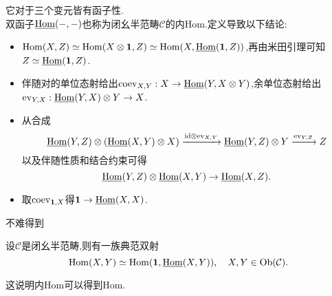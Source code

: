 它对于三个变元皆有函子性.\\

双函子$\underline{\operatorname{Hom}}(-,-)$也称为闭幺半范畴$\mathcal{C}$的内Hom.定义导致以下结论:
\begin{itemize}
    \item $\operatorname{Hom}(X,Z) \simeq \operatorname{Hom}(X\otimes \operatorname{\bold{1}},Z) \simeq \operatorname{Hom}(X,\underline{\operatorname{Hom}}(\operatorname{\bold{1}},Z))$,再由米田引理可知$Z \simeq \underline{\operatorname{Hom}}(\operatorname{\bold{1}},Z)$.
    \item 伴随对的单位态射给出$\operatorname{coev}_{X,Y}:X\to  \underline{\operatorname{Hom}}(Y,X\otimes Y)$,余单位态射给出$\operatorname{ev}_{Y,X}:\underline{\operatorname{Hom}}(Y,X)\otimes Y \to X$.
    \item 从合成
    \[\underline{\operatorname{Hom}}(Y,Z)\otimes(\underline{\operatorname{Hom}}(X,Y)\otimes X) \xrightarrow{\mathrm{id}\otimes\operatorname{ev}_{X,Y}}\underline{\operatorname{Hom}}(Y,Z)\otimes Y\xrightarrow{\operatorname{ev}_{Y,Z}}Z\]
    以及伴随性质和结合约束可得
    \[
    \underline{\operatorname{Hom}}(Y,Z)\otimes\underline{\operatorname{Hom}}(X,Y)\to \underline{\operatorname{Hom}}(X,Z).
    \]
    \item 取$\operatorname{coev}_{\operatorname{\bold{1}},X}$得$\operatorname{\bold{1}} \to \underline{\operatorname{Hom}}(X,X)$.
\end{itemize}
不难得到
\begin{proposition}
    设$\mathcal{C}$是闭幺半范畴,则有一族典范双射
    \[
    \operatorname{Hom}(X,Y) \simeq \operatorname{Hom}(\operatorname{\bold{1}},\underline{\operatorname{Hom}}(X,Y)),\quad X,Y \in \operatorname{Ob}(\mathcal{C}).
    \]
\end{proposition}
这说明内Hom可以得到Hom.\\


